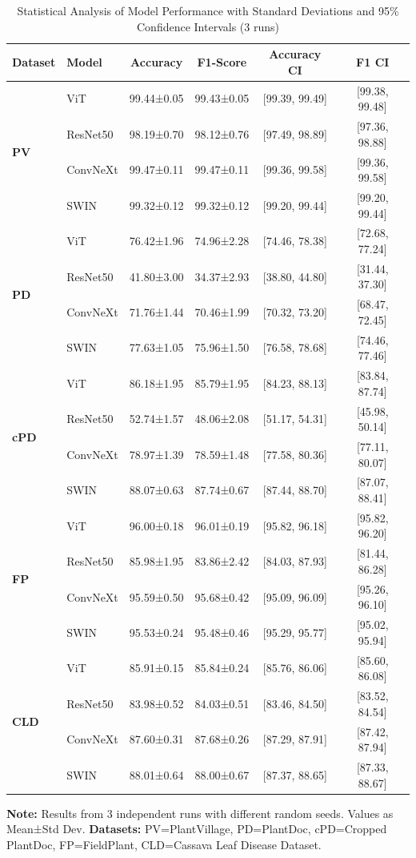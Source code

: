 \documentclass[sn-mathphys]{sn-jnl}
\theoremstyle{thmstyleone}%
\theoremstyle{thmstyletwo}%
\theoremstyle{thmstylethree}%
\begin{document}
\begin{table}[h!]
\centering
\small
\caption{Statistical Analysis of Model Performance with Standard Deviations and 95\% Confidence Intervals (3 runs)}
\label{tab:statistical_analysis}
\begin{tabular}{@{}llcccc@{}}
\toprule
\textbf{Dataset} & \textbf{Model} & \textbf{Accuracy} & \textbf{F1-Score} & \textbf{Accuracy CI} & \textbf{F1 CI} \\
\midrule
\multirow{4}{*}{\textbf{PV}} 
& ViT & 99.44±0.05 & 99.43±0.05 & [99.39, 99.49] & [99.38, 99.48] \\
& ResNet50 & 98.19±0.70 & 98.12±0.76 & [97.49, 98.89] & [97.36, 98.88] \\
& ConvNeXt & 99.47±0.11 & 99.47±0.11 & [99.36, 99.58] & [99.36, 99.58] \\
& SWIN & 99.32±0.12 & 99.32±0.12 & [99.20, 99.44] & [99.20, 99.44] \\
\midrule
\multirow{4}{*}{\textbf{PD}} 
& ViT & 76.42±1.96 & 74.96±2.28 & [74.46, 78.38] & [72.68, 77.24] \\
& ResNet50 & 41.80±3.00 & 34.37±2.93 & [38.80, 44.80] & [31.44, 37.30] \\
& ConvNeXt & 71.76±1.44 & 70.46±1.99 & [70.32, 73.20] & [68.47, 72.45] \\
& SWIN & 77.63±1.05 & 75.96±1.50 & [76.58, 78.68] & [74.46, 77.46] \\
\midrule
\multirow{4}{*}{\textbf{cPD}} 
& ViT & 86.18±1.95 & 85.79±1.95 & [84.23, 88.13] & [83.84, 87.74] \\
& ResNet50 & 52.74±1.57 & 48.06±2.08 & [51.17, 54.31] & [45.98, 50.14] \\
& ConvNeXt & 78.97±1.39 & 78.59±1.48 & [77.58, 80.36] & [77.11, 80.07] \\
& SWIN & 88.07±0.63 & 87.74±0.67 & [87.44, 88.70] & [87.07, 88.41] \\
\midrule
\multirow{4}{*}{\textbf{FP}} 
& ViT & 96.00±0.18 & 96.01±0.19 & [95.82, 96.18] & [95.82, 96.20] \\
& ResNet50 & 85.98±1.95 & 83.86±2.42 & [84.03, 87.93] & [81.44, 86.28] \\
& ConvNeXt & 95.59±0.50 & 95.68±0.42 & [95.09, 96.09] & [95.26, 96.10] \\
& SWIN & 95.53±0.24 & 95.48±0.46 & [95.29, 95.77] & [95.02, 95.94] \\
\midrule
\multirow{4}{*}{\textbf{CLD}} 
& ViT & 85.91±0.15 & 85.84±0.24 & [85.76, 86.06] & [85.60, 86.08] \\
& ResNet50 & 83.98±0.52 & 84.03±0.51 & [83.46, 84.50] & [83.52, 84.54] \\
& ConvNeXt & 87.60±0.31 & 87.68±0.26 & [87.29, 87.91] & [87.42, 87.94] \\
& SWIN & 88.01±0.64 & 88.00±0.67 & [87.37, 88.65] & [87.33, 88.67] \\
\bottomrule
\end{tabular}

\vspace{0.2cm}
\textbf{Note:} Results from 3 independent runs with different random seeds. Values as Mean±Std Dev. 
\textbf{Datasets:} PV=PlantVillage, PD=PlantDoc, cPD=Cropped PlantDoc, FP=FieldPlant, CLD=Cassava Leaf Disease Dataset.
\end{table}
\end{document}
